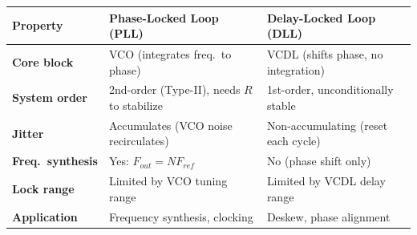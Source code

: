 \documentclass[12pt,a4paper]{article}
\renewcommand{\arraystretch}{1.45}
\begin{document}
\begin{tcolorbox}[tikzbox, title={\textbf{PLL vs.~DLL Architecture Comparison}}]
\centering
\par\noindent
\renewcommand{\arraystretch}{1.3}
\begin{tabularx}{\linewidth}{|B{3.0cm}|Y|Y|}
\hline
\textbf{Property} & \textbf{Phase-Locked Loop (PLL)} & \textbf{Delay-Locked Loop (DLL)} \\ \hline
\textbf{Core block} & VCO (integrates freq.~to phase) & VCDL (shifts phase, no integration) \\ \hline
\textbf{System order} & 2nd-order (Type-II), needs $R$ to stabilize & 1st-order, unconditionally stable \\ \hline
\textbf{Jitter} & Accumulates (VCO noise recirculates) & Non-accumulating (reset each cycle) \\ \hline
\textbf{Freq.~synthesis} & Yes: $F_{out} = N F_{ref}$ & No (phase shift only) \\ \hline
\textbf{Lock range} & Limited by VCO tuning range & Limited by VCDL delay range \\ \hline
\textbf{Application} & Frequency synthesis, clocking & Deskew, phase alignment \\ \hline
\end{tabularx}
\end{tcolorbox}
\end{document}
